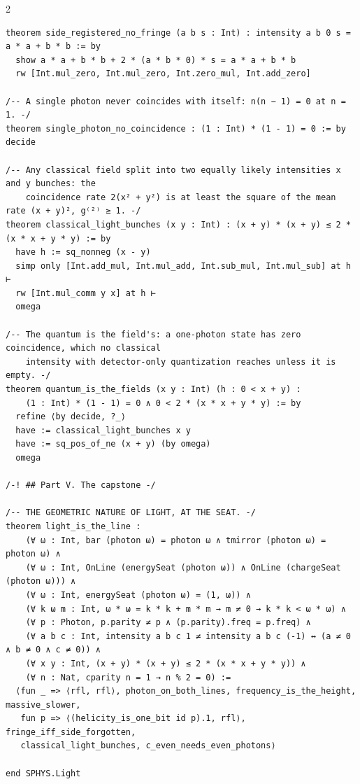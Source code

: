 \documentclass[10pt]{article}
\begin{document}
\begin{multicols}{2}
\begin{Verbatim}[fontsize=\fontsize{6.0}{6.9}\selectfont,breaklines,breakanywhere,breaksymbolleft={}]
theorem side_registered_no_fringe (a b s : Int) : intensity a b 0 s = a * a + b * b := by
  show a * a + b * b + 2 * (a * b * 0) * s = a * a + b * b
  rw [Int.mul_zero, Int.mul_zero, Int.zero_mul, Int.add_zero]

/-- A single photon never coincides with itself: n(n − 1) = 0 at n = 1. -/
theorem single_photon_no_coincidence : (1 : Int) * (1 - 1) = 0 := by decide

/-- Any classical field split into two equally likely intensities x and y bunches: the
    coincidence rate 2(x² + y²) is at least the square of the mean rate (x + y)², g⁽²⁾ ≥ 1. -/
theorem classical_light_bunches (x y : Int) : (x + y) * (x + y) ≤ 2 * (x * x + y * y) := by
  have h := sq_nonneg (x - y)
  simp only [Int.add_mul, Int.mul_add, Int.sub_mul, Int.mul_sub] at h ⊢
  rw [Int.mul_comm y x] at h ⊢
  omega

/-- The quantum is the field's: a one-photon state has zero coincidence, which no classical
    intensity with detector-only quantization reaches unless it is empty. -/
theorem quantum_is_the_fields (x y : Int) (h : 0 < x + y) :
    (1 : Int) * (1 - 1) = 0 ∧ 0 < 2 * (x * x + y * y) := by
  refine ⟨by decide, ?_⟩
  have := classical_light_bunches x y
  have := sq_pos_of_ne (x + y) (by omega)
  omega

/-! ## Part V. The capstone -/

/-- THE GEOMETRIC NATURE OF LIGHT, AT THE SEAT. -/
theorem light_is_the_line :
    (∀ ω : Int, bar (photon ω) = photon ω ∧ tmirror (photon ω) = photon ω) ∧
    (∀ ω : Int, OnLine (energySeat (photon ω)) ∧ OnLine (chargeSeat (photon ω))) ∧
    (∀ ω : Int, energySeat (photon ω) = (1, ω)) ∧
    (∀ k ω m : Int, ω * ω = k * k + m * m → m ≠ 0 → k * k < ω * ω) ∧
    (∀ p : Photon, p.parity ≠ p ∧ (p.parity).freq = p.freq) ∧
    (∀ a b c : Int, intensity a b c 1 ≠ intensity a b c (-1) ↔ (a ≠ 0 ∧ b ≠ 0 ∧ c ≠ 0)) ∧
    (∀ x y : Int, (x + y) * (x + y) ≤ 2 * (x * x + y * y)) ∧
    (∀ n : Nat, cparity n = 1 → n % 2 = 0) :=
  ⟨fun _ => ⟨rfl, rfl⟩, photon_on_both_lines, frequency_is_the_height, massive_slower,
   fun p => ⟨(helicity_is_one_bit id p).1, rfl⟩, fringe_iff_side_forgotten,
   classical_light_bunches, c_even_needs_even_photons⟩

end SPHYS.Light


\end{Verbatim}
\end{multicols}
\end{document}
